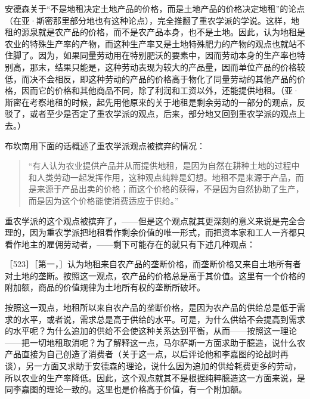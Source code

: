 

安德森关于“不是地租决定土地产品的价格，而是土地产品的价格决定地租”的论点（在亚·斯密那里部分地也有这种论点），完全推翻了重农学派的学说。这样，地租的源泉就是农产品的价格，而不是农产品本身，也不是土地。因此，认为地租是农业的特殊生产率的产物，而这种生产率又是土地特殊肥力的产物的观点也就站不住脚了。因为，如果同量劳动用在特别肥沃的要素中，因而劳动本身的生产率也特别高，那末，结果只能是，这种劳动表现为较大的产品量，因而单位产品的价格较低，而决不会相反，即这种劳动的产品的价格高于物化了同量劳动的其他产品的价格，因而它的价格和其他商品不同，除了利润和工资以外，还能提供地租。（亚·斯密在考察地租的时候，起先用他原来的关于地租是剩余劳动的一部分的观点，反驳了，或者至少是否定了重农学派的观点，后来，部分地又回到重农学派的观点上去。）

布坎南用下面的话概述了重农学派观点被摈弃的情况：

\begin{quote}{“有人认为农业提供产品并从而提供地租，是因为自然在耕种土地的过程中和人类劳动一起发挥作用，这种观点纯粹是幻想。地租不是来源于产品，而是来源于产品出卖的价格；而这个价格的获得，不是因为自然协助了生产，而是因为这个价格能使消费适应于供给。”}\end{quote}

重农学派的这个观点被摈弃了，——但是这个观点就其更深刻的意义来说是完全合理的，因为重农学派把地租看作剩余价值的唯一形式，而把资本家和工人一齐都只看作地主的雇佣劳动者，——剩下可能存在的就只有下述几种观点：

［523］［第一，］认为地租来自农产品的垄断价格，而垄断价格又来自土地所有者对土地的垄断。按照这一观点，农产品的价格总是高于其价值。这里有一个价格的附加额，商品的价值规律为土地所有权的垄断所破坏。

按照这一观点，地租所以来自农产品的垄断价格，是因为农产品的供给总是低于需求的水平，或者说，需求总是高于供给的水平。可是，为什么供给不会提高到需求的水平呢？为什么追加的供给不会使这种关系达到平衡，从而——按照这一理论——把一切地租取消呢？为了解释这一点，马尔萨斯一方面求助于臆造，说什么农产品直接为自己创造了消费者（关于这一点，以后评论他和李嘉图的论战时再谈），另一方面又求助于安德森的理论，说什么因为追加的供给耗费更多的劳动，所以农业的生产率降低。因此，这个观点就其不是根据纯粹臆造这一方面来说，是同李嘉图的理论一致的。这里也是价格高于价值，有一个附加额。

